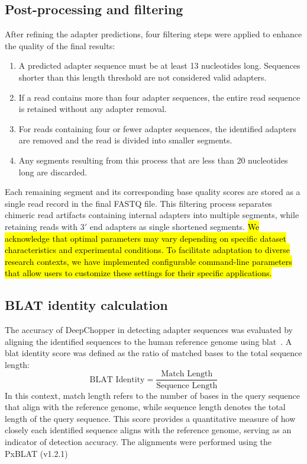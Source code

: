 \documentclass[pdflatex,sn-nature, lineno]{sn-jnl}%
\begin{document}
\subsection{Post-processing and filtering}

After refining the adapter predictions, four filtering steps were applied to enhance the quality of the final results:
\vspace{.5em}
\begin{enumerate}[leftmargin=2em]
	\item A predicted adapter sequence must be at least 13 nucleotides long. Sequences shorter than this length threshold are not considered valid adapters.
	\item If a read contains more than four adapter sequences, the entire read sequence is retained without any adapter removal.
	\item For reads containing four or fewer adapter sequences, the identified adapters are removed and the read is divided into smaller segments.
	\item Any segments resulting from this process that are less than 20 nucleotides long are discarded.
\end{enumerate}
\vspace{.5em}
Each remaining segment and its corresponding base quality scores are stored as a single read record in the final FASTQ file.
This filtering process separates chimeric read artifacts containing internal adapters into multiple segments, while retaining reads with $3'$ end adapters as single shortened segments.
\hl{We acknowledge that optimal parameters may vary depending on specific dataset characteristics and experimental conditions. To facilitate adaptation to diverse research contexts, we have implemented configurable command-line parameters that allow users to customize these settings for their specific applications.}

\subsection{BLAT identity calculation}

The accuracy of DeepChopper in detecting adapter sequences was evaluated by aligning the identified sequences to the human reference genome using \gls{blat}~\cite{kent2002blat}.
A \gls{blat} identity score was defined as the ratio of matched bases to the total sequence length:
\[
	\textrm{BLAT Identity} = \frac{\textrm{Match Length}}{\textrm{Sequence Length}}
\]
In this context, match length refers to the number of bases in the query sequence that align with the reference genome, while sequence length denotes the total length of the query sequence.
This score provides a quantitative measure of how closely each identified sequence aligns with the reference genome, serving as an indicator of detection accuracy.
The alignments were performed using the PxBLAT (v1.2.1)~\cite{li2024pxblat}
\end{document}
